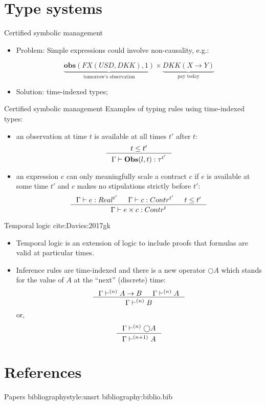 \documentclass[aspectratio=169]{beamer}
\newcommand{\describe}[2]{\underbrace{#1}_{\text{#2}}}
\begin{document}
\section{Type systems}
\label{sec:org0c835d6}
\begin{frame}[label={sec:orgdf0c27a}]{Certified symbolic management}
\begin{itemize}
\item \alert{Problem}: Simple expressions could involve non-causality, e.g.:

$$\describe{\textbf{obs}(FX(USD, DKK), 1)}{tomorrow's observation} \times \describe{DKK(X \rightarrow Y)}{pay today}$$

\item \alert{Solution}: time-indexed types;
\end{itemize}
\end{frame}

\begin{frame}[label={sec:org5efd562}]{Certified symbolic management}
\alert{Examples} of typing rules using time-indexed types:

\begin{itemize}
\item an observation at time \(t\) is available at all times \(t'\) after \(t\):
$$\inference{t \leq t'}{\Gamma |- \textbf{Obs}(l,t) : \tau^{t'}}$$

\item an expression \(e\) can only meaningfully scale a contract \(c\) if \(e\) is
available at some time \(t'\) and \(c\) makes no stipulations strictly before
\(t'\): $$\inference{\Gamma |- e: Real^{t'} & \Gamma |- c: Contr^{t'} & t \leq t'}{\Gamma |- e \times c:
  Contr^t}$$
\end{itemize}
\end{frame}

\begin{frame}[label={sec:org54082d3}]{Temporal logic cite:Davies:2017gk}
\begin{itemize}
\item Temporal logic is an extension of logic to include proofs that formulas are
valid at particular times.

\item Inference rules are time-indexed and there is a new operator \(\bigcirc A\) which stands for
the value of \(A\) at the ``next'' (discrete) time:
$$\inference{\Gamma |-^{(n)} A \rightarrow B & \Gamma |-^{(n)} A}{\Gamma |-^{(n)} B}$$ or,
$$\inference{\Gamma |-^{(n)} \bigcirc A}{\Gamma |-^{(n+1)} A}$$
\end{itemize}
\end{frame}









\section{References}
\label{sec:org0b236e5}
\begin{frame}[label={sec:org41fc2d2}]{Papers}
bibliographystyle:unsrt
bibliography:biblio.bib
\end{frame}
\end{document}
